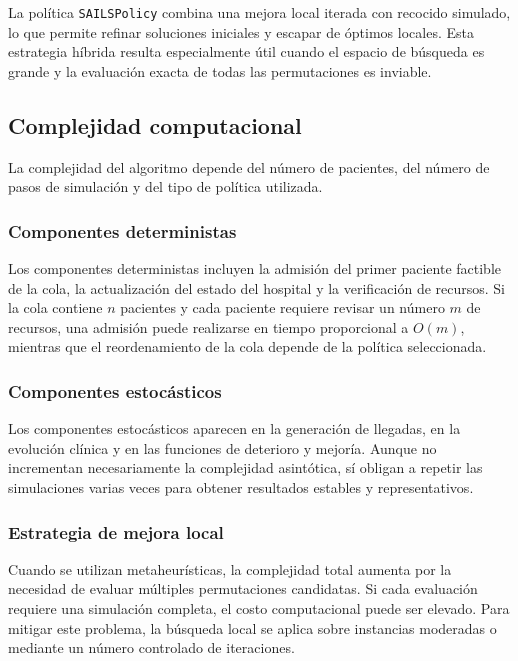 \documentclass[12pt,a4paper]{article}
\begin{document}
La política \texttt{SAILSPolicy} combina una mejora local iterada con recocido simulado, 
lo que permite refinar soluciones iniciales y escapar de óptimos locales. 
Esta estrategia híbrida resulta especialmente útil cuando el espacio de búsqueda es grande y la evaluación 
exacta de todas las permutaciones es inviable.

\subsection{Complejidad computacional}

La complejidad del algoritmo depende del número de pacientes, del número de pasos de simulación y del tipo de política utilizada.

\subsubsection{Componentes deterministas}

Los componentes deterministas incluyen la admisión del primer paciente factible de la cola, 
la actualización del estado del hospital y la verificación de recursos. 
Si la cola contiene \(n\) pacientes y cada paciente requiere revisar un número \(m\) de recursos, 
una admisión puede realizarse en tiempo proporcional a \(O(m)\), 
mientras que el reordenamiento de la cola depende de la política seleccionada.

\subsubsection{Componentes estocásticos}

Los componentes estocásticos aparecen en la generación de llegadas, en la evolución clínica y en las funciones de deterioro y 
mejoría. Aunque no incrementan necesariamente la complejidad asintótica, sí obligan a repetir las simulaciones varias veces 
para obtener resultados estables y representativos.

\subsubsection{Estrategia de mejora local}

Cuando se utilizan metaheurísticas, la complejidad total aumenta por la necesidad de evaluar múltiples permutaciones candidatas. 
Si cada evaluación requiere una simulación completa, el costo computacional puede ser elevado. 
Para mitigar este problema, la búsqueda local se aplica sobre instancias moderadas o mediante un número controlado de iteraciones.
\end{document}

